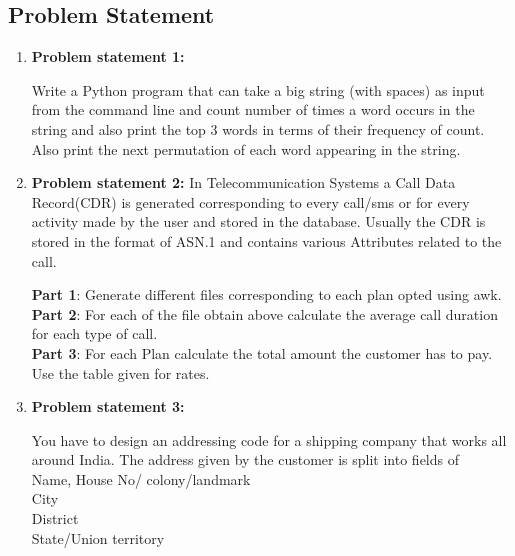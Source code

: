 \documentclass[12pt,a4paper]{article}
\begin{document}
{{{\begin{center}
\section{
Problem Statement }
\end{center}
\begin{enumerate}


 \item\textbf{\large{Problem statement 1:}}
 
Write a Python program that can take a big string (with spaces) as input from the command line and count number of times a word occurs in the string and also print the top 3 words in terms of their frequency of count.\\
Also print the next permutation of each word appearing in the string.



\bigskip


\item\textbf{\large{Problem statement 2:}}
In Telecommunication Systems a Call Data Record(CDR) is generated corresponding to every call/sms or for every activity made by the user and stored in the database. Usually the CDR is stored in the format of ASN.1 and contains various Attributes related to the call.\\ 
\bigskip

\textbf{Part 1}: Generate different files corresponding to each plan opted using awk.\\
\bigskip
\textbf{Part 2}: For each of the file obtain above calculate the average call duration for each type of call.
\\
\bigskip
\textbf{Part 3}:
For each Plan calculate the total amount the customer has to pay. Use the table given for rates.\\

\item\textbf{{\large{Problem statement 3:}}}

You have to design an addressing code for a shipping company that works all around India. The address given by the customer is split into fields of \\
Name, House No/ colony/landmark\\
City\\
District\\
State/Union territory










\end{enumerate}

}}}
\end{document}

